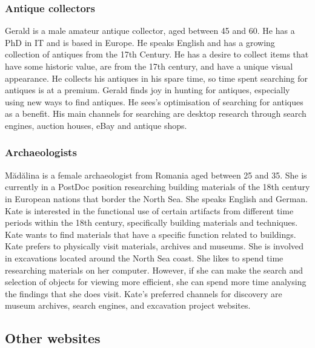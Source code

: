 \subsubsection{Antique collectors}

Gerald is a male amateur antique collector, aged between 45 and 60.  He has a PhD in IT and is based in Europe.  He speaks English and has a growing collection of antiques from the 17th Century.  He has a desire to collect items that have some historic value, are from the 17th century, and have a unique visual appearance.  He collects his antiques in his spare time, so time spent searching for antiques is at a premium.  Gerald finds joy in hunting for antiques, especially using new ways to find antiques.  He sees's optimisation of searching for antiques as a benefit.  His main channels for searching are desktop research through search engines, auction houses, eBay and antique shops.

\subsubsection{Archaeologists}

Mădălina is a female archaeologist from Romania aged between 25 and 35.  She is currently in a PostDoc position researching building materials of the 18th century in European nations that border the North Sea.  She speaks English and German.  Kate is interested in the functional use of certain artifacts from different time periods within the 18th century, specifically building materials and techniques. Kate wants to find materials that have a specific function related to buildings.  Kate prefers to physically visit materials, archives and museums.  She is involved in excavations located around the North Sea coast.  She likes to spend time researching materials on her computer.  However, if she can make the search and selection of objects for viewing more efficient, she can spend more time analysing the findings that she does visit.  Kate's preferred channels for discovery are museum archives, search engines, and excavation project websites.

\subsection{Other websites}

